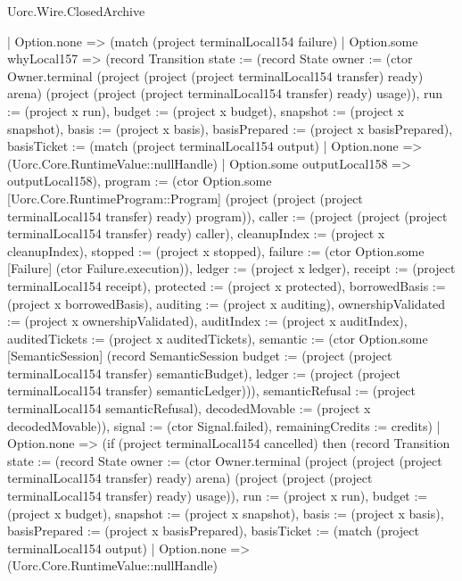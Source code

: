 \begin{lexlean}{Uorc.Wire.ClosedArchive}
\begin{semanticmodule}
{        | Option.none => (match (project terminalLocal154 failure)
          | Option.some whyLocal157 => (record Transition {state := (record State {owner := (ctor Owner.terminal (project (project (project terminalLocal154 transfer) ready) arena) (project (project (project terminalLocal154 transfer) ready) usage)), run := (project x run), budget := (project x budget), snapshot := (project x snapshot), basis := (project x basis), basisPrepared := (project x basisPrepared), basisTicket := (match (project terminalLocal154 output)
            | Option.none => (Uorc.Core.RuntimeValue::nullHandle)
            | Option.some outputLocal158 => outputLocal158), program := (ctor Option.some [Uorc.Core.RuntimeProgram::Program] (project (project (project terminalLocal154 transfer) ready) program)), caller := (project (project (project terminalLocal154 transfer) ready) caller), cleanupIndex := (project x cleanupIndex), stopped := (project x stopped), failure := (ctor Option.some [Failure] (ctor Failure.execution)), ledger := (project x ledger), receipt := (project terminalLocal154 receipt), protected := (project x protected), borrowedBasis := (project x borrowedBasis), auditing := (project x auditing), ownershipValidated := (project x ownershipValidated), auditIndex := (project x auditIndex), auditedTickets := (project x auditedTickets), semantic := (ctor Option.some [SemanticSession] (record SemanticSession {budget := (project (project terminalLocal154 transfer) semanticBudget), ledger := (project (project terminalLocal154 transfer) semanticLedger)})), semanticRefusal := (project terminalLocal154 semanticRefusal), decodedMovable := (project x decodedMovable)}), signal := (ctor Signal.failed), remainingCredits := credits})
          | Option.none => (if (project terminalLocal154 cancelled) then (record Transition {state := (record State {owner := (ctor Owner.terminal (project (project (project terminalLocal154 transfer) ready) arena) (project (project (project terminalLocal154 transfer) ready) usage)), run := (project x run), budget := (project x budget), snapshot := (project x snapshot), basis := (project x basis), basisPrepared := (project x basisPrepared), basisTicket := (match (project terminalLocal154 output)
            | Option.none => (Uorc.Core.RuntimeValue::nullHandle)
}}}
\end{semanticmodule}
\end{lexlean}
